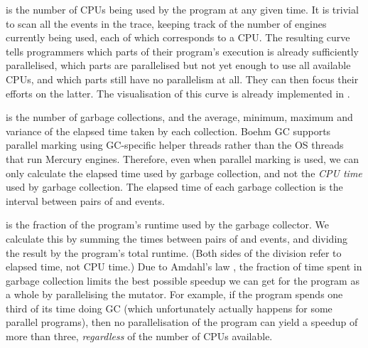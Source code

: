 
is the number of CPUs being used by the program at any given time.
It is trivial to scan all the events in the trace,
keeping track of the number of engines currently being used,
each of which corresponds to a CPU.
The resulting curve tells programmers
which parts of their program's execution is already sufficiently parallelised,
which parts are parallelised but not yet enough to use all available CPUs,
and which parts still have no parallelism at all.
They can then focus their efforts on the latter.
The visualisation of this curve is already implemented in \tscope
\citep{threadscope}.

 is the number of garbage collections,
and the average, minimum, maximum and variance
of the elapsed time taken by each collection.
Boehm GC supports parallel marking using GC-specific helper threads
rather than the OS threads that run Mercury engines.
Therefore, even when parallel marking is used,
we can only calculate the elapsed time used by garbage collection,
and not the \emph{CPU time} used by garbage collection.
The elapsed time of each garbage collection
is the interval between pairs of  and 
events.

is the fraction of the program's runtime used by the garbage collector.
We calculate this by summing the times
between pairs of  and  events,
and dividing the result by the program's total runtime.
(Both sides of the division refer to elapsed time, not CPU time.)
Due to Amdahl's law \citep{amdahl:1967:law},
the fraction of time spent in garbage collection limits the best possible
speedup we can get for the program as a whole by parallelising the mutator.
For example, if the program spends one third of its time doing GC
(which unfortunately actually happens for some parallel programs),
then no parallelisation of the program can yield a speedup of more than three,
\emph{regardless} of the number of CPUs available.

